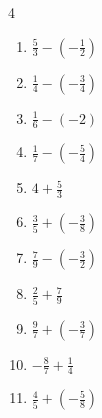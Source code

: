 \begin{multicols}{4}
\begin{enumerate}

  \item $\displaystyle \frac{5}{3} - \left(-\frac{1}{2}\right)$


  \item $\displaystyle \frac{1}{4} - \left(-\frac{3}{4}\right)$

        \phantom{$\displaystyle =1$}

  \item $\displaystyle \frac{1}{6} - \left(-2\right)$


  \item $\displaystyle \frac{1}{7} - \left(-\frac{5}{4}\right)$


  \item $\displaystyle 4 + \frac{5}{3}$


  \item $\displaystyle \frac{3}{5} + \left(-\frac{3}{8}\right)$


\columnbreak %

  \item $\displaystyle \frac{7}{9} - \left(-\frac{3}{2}\right)$


  \item $\displaystyle \frac{2}{5} + \frac{7}{9}$


  \item $\displaystyle \frac{9}{7} + \left(-\frac{3}{7}\right)$


  \item $\displaystyle -\frac{8}{7} + \frac{1}{4}$


  \item $\displaystyle \frac{4}{5} + \left(-\frac{5}{8}\right)$



\end{enumerate}
\end{multicols}
